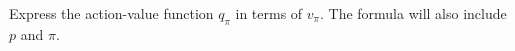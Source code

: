 Express the action-value function $q_\pi$ in terms of $v_\pi$. The formula will also include $p$ and $\pi$.

\smallspace
